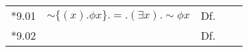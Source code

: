\noindent\begin{tabular}[t]{l@{\quad}l@{\quad}l@{\quad}ll}
{*9.01} & $\sim\{(x).\phi{x}\}.=.(\exists{x}).\sim\phi{x}$ & Df.\\
{*9.02} & $$ & Df.\\
\end{tabular}